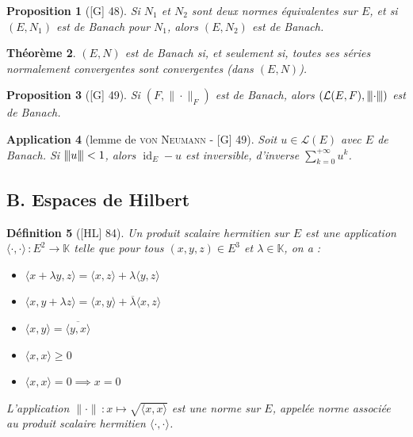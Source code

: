 \documentclass[10pt, a4paper, parskip=full, twoside, twocolumn]{report}
\newtheorem{definition}{Définition}
\newtheorem{theorem}[definition]{Théorème}
\newtheorem{proposition}[definition]{Proposition}
\newtheorem{application}[definition]{Application}
\newcommand{\IK}{\mathbb{K}}
\DeclareMathOperator{\id}{id}
\newcommand{\vertiii}[1]{{\left\vert\kern-0.25ex\left\vert\kern-0.25ex\left\vert #1 
    \right\vert\kern-0.25ex\right\vert\kern-0.25ex\right\vert}}
\begin{document}
\begin{proposition}[\textnormal{[G] 48}]
	Si $N_1$ et $N_2$ sont deux normes équivalentes sur $E$, et si $(E, N_1)$ est de Banach pour $N_1$, alors $(E,N_2)$ est de Banach.
\end{proposition}

\begin{theorem}
	$(E,N)$ est de Banach si, et seulement si, toutes ses séries normalement convergentes sont convergentes (dans $(E,N)$).
\end{theorem}

\begin{proposition}[\textnormal{[G] 49}]
	Si $(F,\|\cdot\|_F)$ est de Banach, alors $\left(\mathcal{L}(E,F),\vertiii{\cdot}\right)$ est de Banach.
\end{proposition}

\begin{application}[lemme de \textsc{von Neumann} - \textnormal{[G] 49}]
	Soit $u\in\mathcal{L}(E)$ avec $E$ de Banach. Si $\vertiii{u}<1$, alors $\id_E-u$ est inversible, d'inverse $\sum_{k=0}^{+\infty} u^k$.
\end{application}

\subsection*{B. Espaces de Hilbert}

\begin{definition}[\textnormal{[HL] 84}]
	Un \emph{produit scalaire hermitien sur $E$} est une application $\langle\cdot,\cdot\rangle\,\colon E^2\to \IK$ telle que pour tous $(x,y,z)\in E^3$ et $\lambda\in \IK$, on a :
	\begin{itemize}
		\item $\langle x+\lambda y, z\rangle = \langle x,z\rangle + \lambda\langle y,z\rangle$
		\item $\langle x, y+ \lambda z\rangle = \langle x,y\rangle + \overline{\lambda}\langle x,z\rangle$
		\item $\langle x,y \rangle = \overline{\langle y, x\rangle}$
		\item $\langle x,x\rangle \geq 0$
		\item $\langle x,x \rangle = 0\implies x = 0$
	\end{itemize}

	L'application $\|\cdot\|\,\colon x\mapsto\sqrt{\langle x,x\rangle}$ est une norme sur $E$, appelée \emph{norme associée au produit scalaire hermitien $\langle\cdot,\cdot\rangle$.}
\end{definition}
\end{document}
